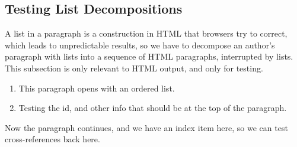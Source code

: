\documentclass[pdflatex]{sn-jnl}
\theoremstyle{thmstyleone}%
\theoremstyle{thmstyletwo}%
\theoremstyle{thmstylethree}%
\numberwithin{equation}{section}
\begin{document}
\subsection{Testing List Decompositions}\label{section-lists-9}%
A list in a paragraph is a construction in HTML that browsers try to correct, which leads to unpredictable results, so we have to decompose an author's paragraph with lists into a sequence of HTML paragraphs, interrupted by lists.  This subsection is only relevant to HTML output, and only for testing.%
\par
%
\begin{enumerate}
\item{}This paragraph opens with an ordered list.%
\item{}Testing the id, and other info that should be at the top of the paragraph.%
\end{enumerate}
Now the paragraph continues, and we have an index item here, so we can test cross-references back here.%
%
%
\typeout{************************************************}
\typeout{************************************************}
%
\end{document}

